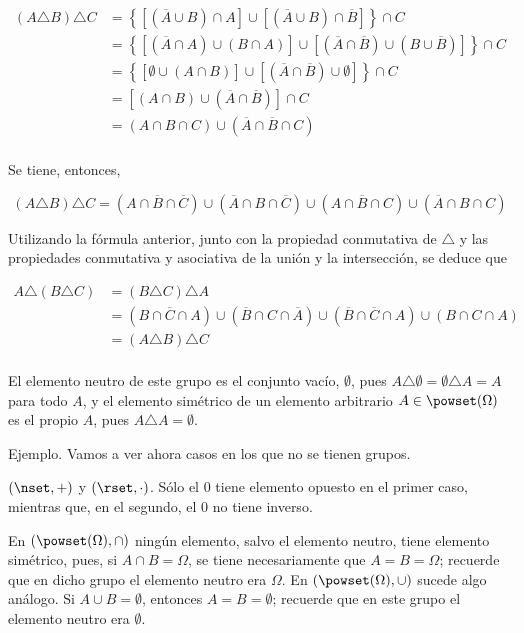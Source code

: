\begin{align*}
  (A \triangle B) \triangle C
    &= \left\{[(\overline{A} \cup B) \cap A] \cup [(\overline{A} \cup B)
      \cap \overline{B}]\right\} \cap C \\
    &= \left\{[(\overline{A} \cap A) \cup (B \cap A)] \cup [(\overline{A}
      \cap \overline{B}) \cup (B \cup \overline{B})]\right\} \cap C \\
    &= \left\{[\emptyset \cup (A \cap B)] \cup [(\overline{A} \cap
      \overline{B}) \cup \emptyset]\right\} \cap C \\
    &= [(A \cap B) \cup (\overline{A} \cap \overline{B})] \cap C \\
    &= (A \cap B \cap C) \cup (\overline{A} \cap \overline{B} \cap C) \\
\end{align*}

\noindent Se tiene, entonces,

$$ (A \triangle B) \triangle C = (A \cap \overline{B} \cap \overline{C})
\cup (\overline{A} \cap B \cap \overline{C}) \cup (A \cap \overline{B} \cap
C) \cup (\overline{A} \cap B \cap C) $$

Utilizando la fórmula anterior, junto con la propiedad conmutativa de
$\triangle$ y las propiedades conmutativa y asociativa de la unión y la
intersección, se deduce que

\begin{align*}
  A \triangle (B \triangle C) &= (B \triangle C) \triangle A \\
    &= (B \cap \overline{C} \cap A) \cup (\overline{B} \cap C \cap
      \overline{A}) \cup (\overline{B} \cap \overline{C} \cap A) \cup (B
      \cap C \cap A) \\
    &= (A \triangle B) \triangle C \\
\end{align*}

El elemento neutro de este grupo es el conjunto vacío, $\emptyset$, pues $A
\triangle \emptyset = \emptyset \triangle A = A$ para todo $A$, y el
elemento simétrico de un elemento arbitrario $A \in \powset(\Omega)$ es el
propio $A$, pues $A \triangle A = \emptyset$.

Ejemplo. Vamos a ver ahora casos en los que no se tienen grupos.

$(\nset, +)$ y $(\rset, \cdot)$. Sólo el $0$ tiene elemento opuesto en el
primer caso, mientras que, en el segundo, el $0$ no tiene inverso.

En $(\powset(\Omega), \cap)$ ningún elemento, salvo el elemento neutro,
tiene elemento simétrico, pues, si $A \cap B = \Omega$, se tiene
necesariamente que $A = B = \Omega$; recuerde que en dicho grupo el elemento
neutro era $\Omega$. En $(\powset(\Omega), \cup)$ sucede algo análogo. Si $A
\cup B = \emptyset$, entonces $A = B = \emptyset$; recuerde que en este
grupo el elemento neutro era $\emptyset$.

